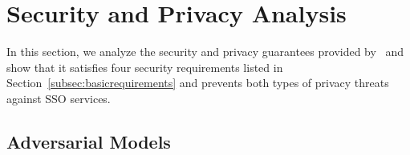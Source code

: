 \section{Security and Privacy Analysis}
\label{sec:analysis}
In this section, we analyze the security and privacy guarantees provided by \usso~and show that it satisfies four security requirements listed in Section~\ref{subsec:basicrequirements} and prevents both types of privacy threats against SSO services.

\subsection{Adversarial Models}
\label{adver-model}




